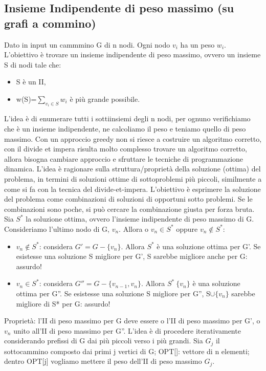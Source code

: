 \documentclass{article}
\begin{document}
\subsection{Insieme Indipendente di peso massimo (su grafi a commino)}
Dato in input un cammmino G di n nodi. Ogni nodo $v_i$ ha un peso $w_i$. L'obiettivo è trovare un insieme indipendente di peso massimo, ovvero un insieme S di nodi tale che: 
\begin{itemize}
    \item S è un II,
    \item w(S)=$\sum_{v_i \in S}w_i$ è più grande possibile.
\end{itemize}
L'idea è di enumerare tutti i sottiinsiemi degli n nodi, per ognuno verifichiamo che è un insieme indipendente, ne calcoliamo il peso e teniamo quello di peso massimo. Con un approccio greedy non si riesce a costruire un algoritmo corretto, con il divide et impera risulta molto complesso trovare un algoritmo corretto, allora bisogna cambiare approccio e sfruttare le tecniche di programmazione dinamica. L'idea è ragionare sulla struttura/proprietà della soluzione (ottima) del problema, in termini di soluzioni ottime di sottoproblemi più piccoli, similmente a come si fa con la tecnica del divide-et-impera. L'obiettivo è esprimere la soluzione del problema come combinazioni di soluzioni di opportuni sotto problemi. Se le combinazioni sono poche, si può cercare la combinazione giusta per forza bruta.
Sia $S^*$ la soluzione ottima, ovvero l'insieme indipendente di peso massimo di G. Consideriamo l'ultimo nodo di G, $v_n$. Allora o $v_n \in S^*$ oppure $v_n \notin S^*$:
\begin{itemize}
    \item $v_n \notin S^*$: considera $G'=G-\{v_n\}$. Allora $S^*$ è una soluzione ottima per G'. Se esistesse una soluzione S migliore per G', S sarebbe migliore anche per G: assurdo!
    \item $v_n \in S^*$: considera $G''=G-\{v_{n-1}, v_n\}$. Allora $S^*\ \{v_n\}$ è una soluzione ottima per G''. Se esistesse una soluzione S migliore per G'', S$\cup\{v_n\}$ sarebbe migliore di S* per G: assurdo! 
\end{itemize}
Proprietà: l'II di peso massimo per G deve essere o l'II di peso massimo per G', o $v_n$ unito all'II di peso massimo per G''. L'idea è di procedere iterativamente considerando prefissi di G dai più piccoli verso i più grandi. 
Sia $G_j$ il sottocammino composto dai primi j vertici di G; OPT[]: vettore di n elementi; dentro OPT[j] vogliamo mettere il peso dell'II di peso massimo $G_j$.
\end{document}
